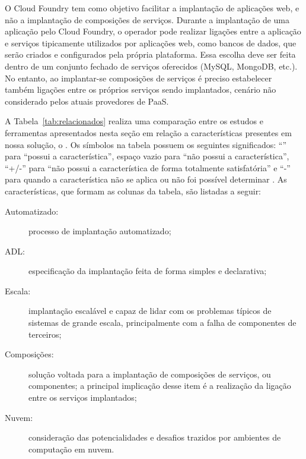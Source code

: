 O Cloud Foundry tem como objetivo facilitar a implantação de aplicações web, e não a implantação de composições de serviços. Durante a implantação de uma aplicação pelo Cloud Foundry, o operador pode realizar ligações entre a aplicação e serviços tipicamente utilizados por aplicações web, como bancos de dados, que serão criados e configurados pela própria plataforma. Essa escolha deve ser feita dentro de um conjunto fechado de serviços oferecidos (MySQL, MongoDB, etc.). No entanto, ao implantar-se composições de serviços é preciso estabelecer também ligações entre os próprios serviços sendo implantados, cenário não considerado pelos atuais provedores de PaaS.



A Tabela~\ref{tab:relacionados} realiza uma comparação entre os estudos e ferramentas apresentados nesta seção em relação a características presentes em nossa solução, o \ee. Os símbolos na tabela possuem os seguintes significados: ``\checkmark{}'' para ``possui a característica'', espaço vazio para ``não possui a característica'', ``+/-'' para ``não possui a característica de forma totalmente satisfatória'' e ``-'' para quando a característica não se aplica ou não foi possível determinar . As características, que formam as colunas da tabela, são listadas a seguir:

\begin{description}
\item [Automatizado:] processo de implantação automatizado;
\item [ADL:] especificação da implantação feita de forma simples e declarativa;
\item [Escala:] implantação escalável e capaz de lidar com os problemas típicos de sistemas de grande escala, principalmente com a falha de componentes de terceiros;
\item [Composições:] solução voltada para a implantação de composições de serviços, ou componentes; a principal implicação desse item é a realização da ligação entre os serviços implantados;
\item [Nuvem:] consideração das potencialidades e desafios trazidos por ambientes de computação em nuvem.
\end{description}

